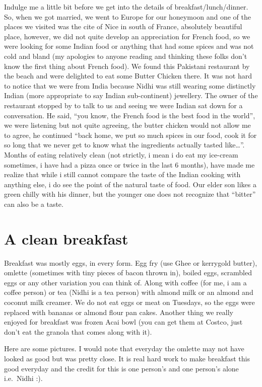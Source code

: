 \documentclass[oneside]{book}
\begin{document}
Indulge me a little bit before we get into the details of
breakfast/lunch/dinner. So, when we got married, we went to Europe for
our honeymoon and one of the places we visited was the cite of Nice in
south of France, absolutely beautiful place, however, we did not quite
develop an appreciation for French food, so we were looking for some
Indian food or anything that had some spices and was not cold and bland
(my apologies to anyone reading and thinking these folks don't know the
first thing about French food). We found this Pakistani restaurant by
the beach and were delighted to eat some Butter Chicken there. It was
not hard to notice that we were from India because Nidhi was still
wearing some distinctly Indian (more appropriate to say Indian
sub-continent) jewellery. The owner of the restaurant stopped by to talk
to us and seeing we were Indian sat down for a conversation. He said,
``you know, the French food is the best food in the world'', we were
listening but not quite agreeing, the butter chicken would not allow me
to agree, he continued ``back home, we put so much spices in our food,
cook it for so long that we never get to know what the ingredients
actually tasted like\ldots{}''. Months of eating relatively clean (not
strictly, i mean i do eat my ice-cream sometimes, i have had a pizza
once or twice in the last 6 months), have made me realize that while i
still cannot compare the taste of the Indian cooking with anything else,
i do see the point of the natural taste of food. Our elder son likes a
green chilly with his dinner, but the younger one does not recognize
that ``bitter'' can also be a taste.

\section{A clean breakfast}\label{a-clean-breakfast}

Breakfast was mostly eggs, in every form. Egg fry (use Ghee or kerrygold
butter), omlette (sometimes with tiny pieces of bacon thrown in), boiled
eggs, scrambled eggs or any other variation you can think of. Along with
coffee (for me, i am a coffee person) or tea (Nidhi is a tea person)
with almond milk or an almond and coconut milk creamer. We do not eat
eggs or meat on Tuesdays, so the eggs were replaced with bananas or
almond flour pan cakes. Another thing we really enjoyed for breakfast
was frozen Acai bowl (you can get them at Costco, just don't eat the
granola that comes along with it).

Here are some pictures. I would note that everyday the omlette may not
have looked as good but was pretty close. It is real hard work to make
breakfast this good everyday and the credit for this is one person's and
one person's alone i.e.~Nidhi :).
\end{document}
